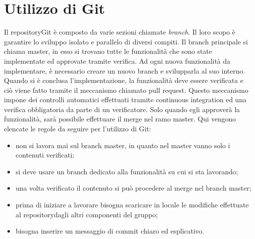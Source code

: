 \section{Utilizzo di Git}
Il repository\glosp Git è composto da varie sezioni chiamate \textit{branch}. Il loro scopo è garantire lo sviluppo isolato e parallelo di diversi compiti. Il branch principale si chiama master, in esso si trovano tutte le funzionalità che sono state implementate ed approvate tramite verifica. Ad ogni nuova funzionalità da implementare, è necessario creare un nuovo branch e svilupparla al suo interno. Quando si è conclusa l'implementazione, la funzionalità deve essere verificata e ciò viene fatto tramite il meccanismo chiamato pull request. Questo meccanismo impone dei controlli automatici effettuati tramite continuous integration ed una verifica obbligatoria da parte di un verificatore. Solo quando egli approverà la funzionalità, sarà possibile effettuare il merge nel ramo master.
Qui vengono elencate le regole da seguire per l'utilizzo di Git:
\begin{itemize}
	\item non si lavora mai sul branch master, in quanto nel master vanno solo i contenuti verificati;
	\item si deve usare un branch dedicato alla funzionalità su cui si sta lavorando;
	\item una volta verificato il contenuto si può procedere al merge nel branch master;
	\item prima di iniziare a lavorare bisogna scaricare in locale le modifiche effettuate al repository\glosp dagli altri componenti del gruppo;
	\item bisogna inserire un messaggio di commit chiaro ed esplicativo.
\end{itemize}
